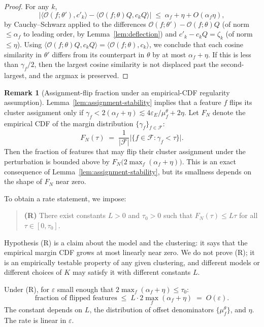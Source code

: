 \documentclass[11pt,letterpaper]{article}
\theoremstyle{definition}
\newtheorem{remark}[theorem]{Remark}
\begin{document}
\begin{proof}
For any $k$,
\[
\big| \langle \mathcal{O}(f; \theta'), c'_k \rangle - \langle \mathcal{O}(f; \theta) Q, c_k Q \rangle \big|
\;\leq\; \alpha_f + \eta + O(\alpha_f \eta),
\]
by Cauchy--Schwarz applied to the differences $\mathcal{O}(f; \theta') - \mathcal{O}(f; \theta) Q$ (of norm $\leq \alpha_f$ to leading order, by Lemma~\ref{lem:deflection}) and $c'_k - c_k Q = \zeta_k$ (of norm $\leq \eta$). Using $\langle \mathcal{O}(f; \theta) Q, c_k Q \rangle = \langle \mathcal{O}(f; \theta), c_k \rangle$, we conclude that each cosine similarity in $\theta'$ differs from its counterpart in $\theta$ by at most $\alpha_f + \eta$. If this is less than $\gamma_f / 2$, then the largest cosine similarity is not displaced past the second-largest, and the argmax is preserved.
\end{proof}

\begin{remark}[Assignment-flip fraction under an empirical-CDF regularity assumption]
\label{rem:margin-density}
Lemma~\ref{lem:assignment-stability} implies that a feature $f$ flips its cluster assignment only if $\gamma_f < 2(\alpha_f + \eta) \lesssim 4 \varepsilon_E / \mu_f^\theta + 2\eta$. Let $F_N$ denote the empirical CDF of the margin distribution $\{\gamma_f\}_{f \in \mathcal{F}}$:
\[
F_N(\tau) \;=\; \frac{1}{|\mathcal{F}|} \big| \{ f \in \mathcal{F} : \gamma_f < \tau \} \big|.
\]
Then the fraction of features that may flip their cluster assignment under the perturbation is bounded above by $F_N\big(2 \max_f (\alpha_f + \eta)\big)$. This is an exact consequence of Lemma~\ref{lem:assignment-stability}, but its smallness depends on the shape of $F_N$ near zero.

To obtain a rate statement, we impose:

\begin{quote}
\textbf{(R)} There exist constants $L > 0$ and $\tau_0 > 0$ such that $F_N(\tau) \leq L \tau$ for all $\tau \in [0, \tau_0]$.
\end{quote}

Hypothesis (R) is a claim about the model and the clustering: it says that the empirical margin CDF grows at most linearly near zero. We do not prove (R); it is an empirically testable property of any given clustering, and different models or different choices of $K$ may satisfy it with different constants $L$.

Under (R), for $\varepsilon$ small enough that $2 \max_f (\alpha_f + \eta) \leq \tau_0$:
\[
\text{fraction of flipped features} \;\leq\; L \cdot 2 \max_f (\alpha_f + \eta) \;=\; O(\varepsilon).
\]
The constant depends on $L$, the distribution of offset denominators $\{\mu_f^\theta\}$, and $\eta$. The rate is linear in $\varepsilon$.
\end{remark}
\end{document}
